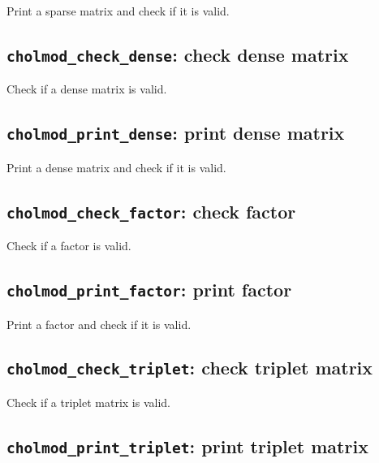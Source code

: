 \documentclass[11pt]{article}
\begin{document}

Print a sparse matrix and check if it is valid.

\subsection{{\tt cholmod\_check\_dense}: check dense matrix}


Check if a dense matrix is valid.

\subsection{{\tt cholmod\_print\_dense}: print dense matrix}


Print a dense matrix and check if it is valid.

\subsection{{\tt cholmod\_check\_factor}: check factor}


Check if a factor is valid.

\subsection{{\tt cholmod\_print\_factor}: print factor}


Print a factor and check if it is valid.

\subsection{{\tt cholmod\_check\_triplet}: check triplet matrix}


Check if a triplet matrix is valid.

\subsection{{\tt cholmod\_print\_triplet}: print triplet matrix}
\end{document}
